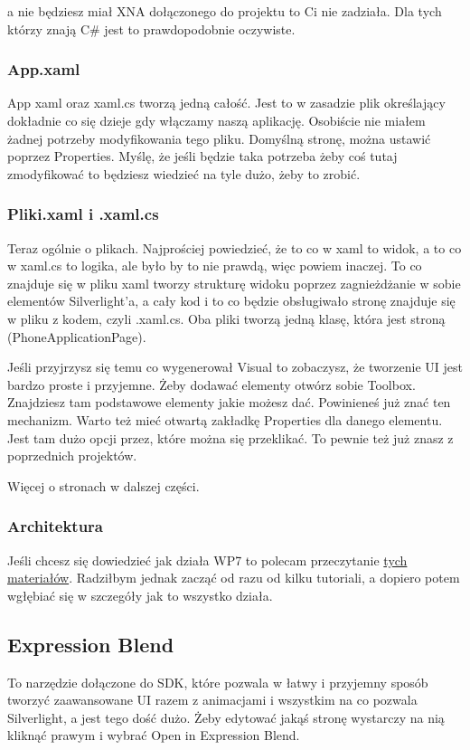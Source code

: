 \documentclass[12pt, a4paper]{article}
\begin{document}
a nie będziesz miał XNA dołączonego do projektu to Ci nie zadziała. Dla tych
którzy znają C\# jest to prawdopodobnie oczywiste.

\subsubsection{App.xaml}
App xaml oraz xaml.cs tworzą jedną całość. Jest to w zasadzie plik określający
dokładnie co się dzieje gdy włączamy naszą aplikację. Osobiście nie miałem
żadnej potrzeby modyfikowania tego pliku. Domyślną stronę, można ustawić poprzez
Properties. Myślę, że jeśli będzie taka potrzeba żeby coś tutaj zmodyfikować to
będziesz wiedzieć na tyle dużo, żeby to zrobić.

\subsubsection{Pliki.xaml i .xaml.cs}
Teraz ogólnie o plikach. Najprościej powiedzieć, że to co w xaml to widok,
a to co w xaml.cs to logika, ale było by to nie prawdą, więc powiem inaczej. To
co znajduje się w pliku xaml tworzy strukturę widoku poprzez zagnieżdżanie w
sobie elementów Silverlight'a, a cały kod i to co będzie obsługiwało stronę
znajduje się w pliku z kodem, czyli .xaml.cs. Oba pliki tworzą jedną klasę,
która jest stroną (PhoneApplicationPage).

Jeśli przyjrzysz się temu co wygenerował Visual to zobaczysz, że tworzenie UI
jest bardzo proste i przyjemne. Żeby dodawać elementy otwórz sobie Toolbox.
Znajdziesz tam podstawowe elementy jakie możesz dać. Powinieneś już znać ten
mechanizm. Warto też mieć otwartą zakładkę Properties dla danego elementu. Jest
tam dużo opcji przez, które można się przeklikać. To pewnie też już znasz z
poprzednich projektów.

Więcej o stronach w dalszej części.

\subsubsection{Architektura}
Jeśli chcesz się dowiedzieć jak działa WP7 to polecam przeczytanie
\href{http://msdn.microsoft.com/en-us/library/ff967549%28v=vs.92%29}{tych
 materiałów}. Radziłbym jednak zacząć od razu od kilku tutoriali, a dopiero
 potem wgłębiać się w szczegóły jak to wszystko działa.

\subsection{Expression Blend}
To narzędzie dołączone do SDK, które pozwala w łatwy i przyjemny sposób tworzyć
zaawansowane UI razem z animacjami i wszystkim na co pozwala Silverlight, a jest
tego dość dużo. Żeby edytować jakąś stronę wystarczy na nią kliknąć prawym i
wybrać Open in Expression Blend.
\end{document}
